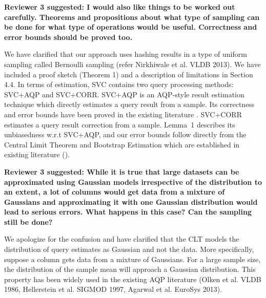 \vspace{1.5em}

\textbf{Reviewer 3 suggested: I would also like things to be worked out carefully. Theorems and propositions about what type of sampling can be done for what type of operations would be useful. Correctness and error bounds should be proved too.}

We have clarified that our approach uses hashing results in a type of uniform sampling called Bernoulli sampling (refer Nirkhiwale et al. VLDB 2013). We have included a proof sketch (Theorem 1) and a description of limitations in Section 4.4. In terms of estimation, SVC contains two query processing methods:  SVC+AQP and SVC+CORR. SVC+AQP is an AQP-style result estimation technique which directly estimates a query result from a sample. Its correctness and error bounds have been proved in the existing literature \cite{AgarwalMPMMS13,agarwalknowing}. SVC+CORR estimates a query result correction from a sample. Lemma~1 describes its unbiasedness w.r.t SVC+AQP, and our error bounds follow directly from the Central Limit Theorem and Bootstrap Estimation which are established in existing literature (\cite{agarwalknowing}).

\vspace{1.5em}

\textbf{Reviewer 3 suggested: While it is true that large datasets can be approximated using Gaussian models irrespective of the distribution to an extent, a lot of columns would get data from a mixture of Gaussians and approximating it with one Gaussian distribution would lead to serious errors. What happens in this case? Can the sampling still be done?}

We apologize for the confusion and have clarified that the CLT models the distribution of query estimates as Gaussian and not the data. More specifically, suppose a column gets data from a mixture of Gaussians. For a large sample size, the distribution of the sample mean will approach a Gaussian distribution. This property has been widely used in the existing AQP literature (Olken et al. VLDB 1986, Hellerstein et al. SIGMOD 1997, Agarwal et al. EuroSys 2013). 

